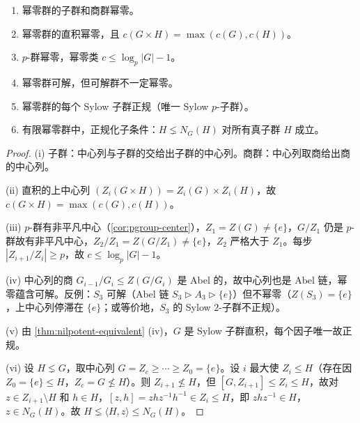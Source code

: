 \begin{proposition}[幂零群的基本性质]
\label{prop:nilpotent-properties}
\begin{enumerate}[label=(\roman*),leftmargin=3em]
\item 幂零群的子群和商群幂零。
\item 幂零群的直积幂零，且 $c(G\times H)=\max(c(G),c(H))$。
\item $p$-群幂零，幂零类 $c\le\log_p|G|-1$。
\item 幂零群可解，但可解群不一定幂零。
\item 幂零群的每个 Sylow 子群正规（唯一 Sylow $p$-子群）。
\item 有限幂零群中，正规化子条件：$H\lneq N_G(H)$ 对所有真子群 $H$ 成立。
\end{enumerate}
\end{proposition}

\begin{proof}
(i) 子群：中心列与子群的交给出子群的中心列。商群：中心列取商给出商的中心列。

(ii) 直积的上中心列 $(Z_i(G\times H))=Z_i(G)\times Z_i(H)$，故 $c(G\times H)=\max(c(G),c(H))$。

(iii) $p$-群有非平凡中心（\cref{cor:pgroup-center}），$Z_1=Z(G)\ne\{e\}$，$G/Z_1$ 仍是 $p$-群故有非平凡中心，$Z_2/Z_1=Z(G/Z_1)\ne\{e\}$，$Z_2$ 严格大于 $Z_1$。每步 $|Z_{i+1}/Z_i|\ge p$，故 $c\le\log_p|G|-1$。

(iv) 中心列的商 $G_{i-1}/G_i\le Z(G/G_i)$ 是 Abel 的，故中心列也是 Abel 链，幂零蕴含可解。反例：$S_3$ 可解（Abel 链 $S_3\rhd A_3\rhd\{e\}$）但不幂零（$Z(S_3)=\{e\}$，上中心列停滞在 $\{e\}$；或等价地，$S_3$ 的 Sylow $2$-子群不正规）。

(v) 由 \cref{thm:nilpotent-equivalent} (iv)，$G$ 是 Sylow 子群直积，每个因子唯一故正规。

(vi) 设 $H\lneq G$，取中心列 $G=Z_c\ge\cdots\ge Z_0=\{e\}$。设 $i$ 最大使 $Z_i\le H$（存在因 $Z_0=\{e\}\le H$，$Z_c=G\nleq H$）。则 $Z_{i+1}\nleq H$，但 $[G,Z_{i+1}]\le Z_i\le H$，故对 $z\in Z_{i+1}\setminus H$ 和 $h\in H$，$[z,h]=zhz^{-1}h^{-1}\in Z_i\le H$，即 $zhz^{-1}\in H$，$z\in N_G(H)$。故 $H\lneq\langle H,z\rangle\le N_G(H)$。
\end{proof}

